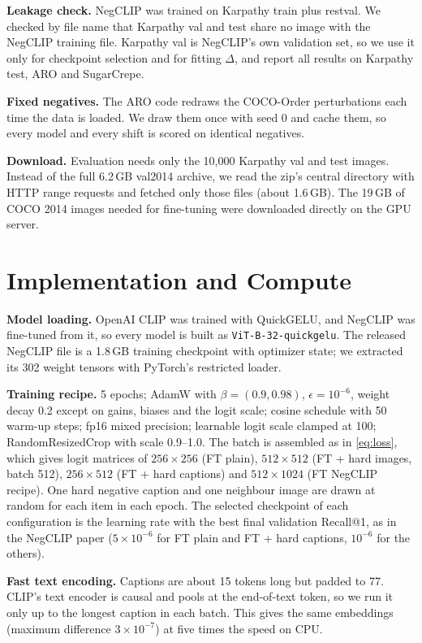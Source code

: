 \documentclass{article}
\begin{document}
\textbf{Leakage check.} NegCLIP was trained on Karpathy train plus restval. We checked by file name that Karpathy val and test share no image with the NegCLIP training file. Karpathy val is NegCLIP's own validation set, so we use it only for checkpoint selection and for fitting $\Delta$, and report all results on Karpathy test, ARO and SugarCrepe.

\textbf{Fixed negatives.} The ARO code redraws the COCO-Order perturbations each time the data is loaded. We draw them once with seed 0 and cache them, so every model and every shift is scored on identical negatives.

\textbf{Download.} Evaluation needs only the 10,000 Karpathy val and test images. Instead of the full 6.2\,GB val2014 archive, we read the zip's central directory with HTTP range requests and fetched only those files (about 1.6\,GB). The 19\,GB of COCO 2014 images needed for fine-tuning were downloaded directly on the GPU server.

\section{Implementation and Compute}
\label{app:impl}

\textbf{Model loading.} OpenAI CLIP was trained with QuickGELU, and NegCLIP was fine-tuned from it, so every model is built as \texttt{ViT-B-32-quickgelu}. The released NegCLIP file is a 1.8\,GB training checkpoint with optimizer state; we extracted its 302 weight tensors with PyTorch's restricted loader.

\textbf{Training recipe.} 5 epochs; AdamW with $\beta=(0.9, 0.98)$, $\epsilon=10^{-6}$, weight decay 0.2 except on gains, biases and the logit scale; cosine schedule with 50 warm-up steps; fp16 mixed precision; learnable logit scale clamped at 100; RandomResizedCrop with scale 0.9--1.0. The batch is assembled as in \cref{eq:loss}, which gives logit matrices of $256{\times}256$ (FT plain), $512{\times}512$ (FT + hard images, batch 512), $256{\times}512$ (FT + hard captions) and $512{\times}1024$ (FT NegCLIP recipe). One hard negative caption and one neighbour image are drawn at random for each item in each epoch. The selected checkpoint of each configuration is the learning rate with the best final validation Recall@1, as in the NegCLIP paper ($5{\times}10^{-6}$ for FT plain and FT + hard captions, $10^{-6}$ for the others).

\textbf{Fast text encoding.} Captions are about 15 tokens long but padded to 77. CLIP's text encoder is causal and pools at the end-of-text token, so we run it only up to the longest caption in each batch. This gives the same embeddings (maximum difference $3{\times}10^{-7}$) at five times the speed on CPU.
\end{document}

